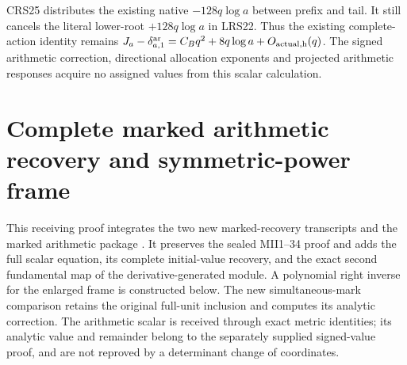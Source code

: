 \documentclass[11pt,a4paper]{article}
\begin{document}
CRS25 distributes the existing native $-128q\log a$ between prefix
and tail. It still cancels the literal lower-root $+128q\log a$
in LRS22. Thus the existing complete-action identity remains
$J_a-\delta^{\rm ar}_{a,1}
=C_Bq^2+8q\log a+O_{\rm actual,h}(q)$.
The signed arithmetic correction, directional allocation exponents
and projected arithmetic responses acquire no assigned values from
this scalar calculation.
\endgroup



\endgroup

\clearpage
\begingroup
\def\CC{\mathbb C}
\def\rank{\operatorname{rank}}
\def\coker{\operatorname{coker}}
\def\im{\operatorname{im}}
\def\tr{\operatorname{tr}}
\def\Sym{\operatorname{Sym}}
\def\diag{\operatorname{diag}}
\def\SF{\operatorname{SF}}

\setcounter{equation}{0}
\renewcommand{\theequation}{A02MAR.\arabic{equation}}
\section*{Complete marked arithmetic recovery and symmetric-power frame}



This receiving proof integrates the two new marked-recovery transcripts
and the marked arithmetic package \cite{a02mar:arrival}. It preserves the sealed
MII1--34 proof \cite{a02mar:mii} and adds the full scalar equation, its complete
initial-value recovery, and the exact second fundamental map of the
derivative-generated module. A polynomial right inverse for the enlarged
frame is constructed below. The new simultaneous-mark comparison retains
the original full-unit inclusion and computes its analytic correction.
The arithmetic scalar is received through exact metric identities; its
analytic value and remainder belong to the separately supplied signed-value
proof, and are not reproved by a determinant change of coordinates.
\end{document}
